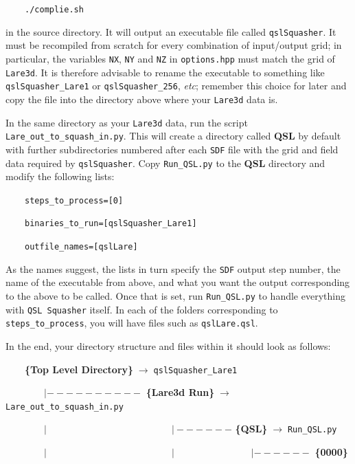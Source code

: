 \documentclass[12pt,twoside]{article}
\begin{document}
$\quad\quad$\texttt{./complie.sh}

in the source directory. It will output an executable file called \texttt{qslSquasher}. It must be recompiled from scratch for every combination of input/output grid; in particular, the variables \texttt{NX}, \texttt{NY} and \texttt{NZ} in \texttt{options.hpp} must match the grid of \texttt{Lare3d}. It is therefore advisable to rename the executable to something like \texttt{qslSquasher\_Lare1} or \texttt{qslSquasher\_256}, \textit{etc}; remember this choice for later and copy the file into the directory above where your \texttt{Lare3d} data is.

In the same directory as your \texttt{Lare3d} data, run the script \texttt{Lare\_out\_to\_squash\_in.py}. This will create a directory called \textbf{QSL} by default with further subdirectories numbered after each \texttt{SDF} file with the grid and field data required by \texttt{qslSquasher}. Copy \texttt{Run\_QSL.py} to the \textbf{QSL} directory and modify the following lists: 

$\quad\quad$\texttt{steps\_to\_process=[0]}

$\quad\quad$\texttt{binaries\_to\_run=[\textquotesingle qslSquasher\_Lare1\textquotesingle ]}

$\quad\quad$\texttt{outfile\_names=[\textquotesingle qslLare\textquotesingle]}

As the names suggest, the lists in turn specify the \texttt{SDF} output step number, the name of the executable from above, and what you want the output corresponding to the above to be called. Once that is set, run \texttt{Run\_QSL.py} to handle everything with \texttt{QSL Squasher} itself. In each of the folders corresponding to \texttt{steps\_to\_process}, you will have files such as \texttt{qslLare.qsl}.

In the end, your directory structure and files within it should look as follows:

$\quad\quad$\textbf{\{Top Level Directory\}}$\;\rightarrow\;$\texttt{qslSquasher\_Lare1}

$\quad\quad\quad\quad | ---------- $ \textbf{\{Lare3d Run\}}$\;\rightarrow\;$\texttt{Lare\_out\_to\_squash\_in.py}

$\quad\quad\quad\quad | \quad\quad\quad\quad\quad\quad\quad\quad\quad\quad\quad\quad\quad | ------ $ \textbf{\{QSL\}}$\;\rightarrow\;$\texttt{Run\_QSL.py}

$\quad\quad\quad\quad | \quad\quad\quad\quad\quad\quad\quad\quad\quad\quad\quad\quad\quad | \quad\quad\quad\quad\quad\quad\quad\quad | ------ $ \textbf{\{0000\}}
\end{document}
